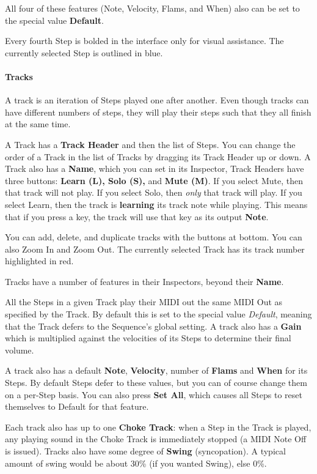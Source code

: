 \documentclass[twoside,10pt]{article}
\begin{document}
All four of these features (Note, Velocity, Flams, and When) also can be set to the special value {\bf Default}.   

Every fourth Step is bolded in the interface only for visual assistance.    The currently selected Step is outlined in blue.

\paragraph{Tracks}

A track is an iteration of Steps played one after another.  Even though tracks can have different numbers of steps, they will play their steps such that they all finish at the same time.

A Track has a {\bf Track Header} and then the list of Steps.  You can change the order of a Track in the list of Tracks by dragging its Track Header up or down.  A Track also has a {\bf Name}, which you can set in its Inspector,  Track Headers have three buttons: {\bf Learn (L), Solo (S),} and {\bf Mute (M)}.  If you select Mute, then that track will not play.  If you select Solo, then {\it only} that track will play.  If you select Learn, then the track is {\bf learning} its track note while playing.  This means that if you press a key, the track will use that key as its output {\bf Note}.     

You can add, delete, and duplicate tracks with the buttons at bottom.  You can also Zoom In and Zoom Out.  The currently selected Track has its track number highlighted in red.

Tracks have a number of features in their Inspectors, beyond their {\bf Name}.

All the Steps in a given Track play their MIDI out the same MIDI Out as specified by the Track.  By default this is set to the special value {\it Default}, meaning that the Track defers to the Sequence's global setting.  A track also has a {\bf Gain} which is multiplied against the velocities of its Steps to determine their final volume.  

A track also has a default {\bf Note}, {\bf Velocity}, number of {\bf Flams} and {\bf When} for its Steps.  By default Steps defer to these values, but you can of course change them on a per-Step basis.  You can also press {\bf Set All}, which causes all Steps to reset themselves to Default for that feature.

Each track also has up to one {\bf Choke Track}: when a Step in the Track is played, any playing sound in the Choke Track is immediately stopped (a MIDI Note Off is issued).  Tracks also have some degree of {\bf Swing} (syncopation).  A typical amount of swing would be about 30\% (if you wanted Swing), else 0\%.
\end{document}
